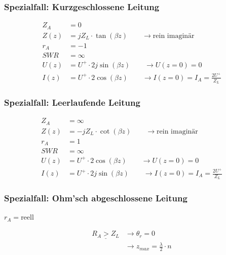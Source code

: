 \subsubsection{Spezialfall: Kurzgeschlossene Leitung}
\begin{align*}
    Z_A  & = 0                                                                        \\
    Z(z) & = j Z_L\cdot\tan(\beta z)        \qquad\rightarrow\text{rein imaginär}     \\
    r_A  & = -1                                                                       \\
    SWR  & = \infty                                                                   \\
    U(z) & = U^+\cdot 2j\sin(\beta z)    \qquad\rightarrow U(z=0)=0                   \\
    I(z) & = U^+\cdot 2\cos(\beta z)    \qquad\rightarrow I(z=0)=I_A=\frac{2U^+}{Z_L}
\end{align*}

\subsubsection{Spezialfall: Leerlaufende Leitung}
\begin{align*}
    Z_A  & = \infty                                                                   \\
    Z(z) & = -jZ_L\cdot \cot(\beta z) \qquad\rightarrow\text{rein imaginär}           \\
    r_A  & = 1                                                                        \\
    SWR  & = \infty                                                                   \\
    U(z) & = U^+\cdot 2\cos(\beta z) \qquad\rightarrow U(z=0)=0                       \\
    I(z) & = U^+\cdot 2j\sin(\beta z) \qquad\rightarrow I(z=0)=I_A = \frac{2U^+}{Z_L}
\end{align*}

\subsubsection{Spezialfall: Ohm'sch abgeschlossene Leitung}
\begin{center}
    $r_A = $reell   
\end{center}

\begin{align*}
    \underline{R_A > Z_L} & \rightarrow\theta_r = 0                      \\
     & \rightarrow z_{max}=\frac{\lambda}{2}\cdot n
\end{align*}

